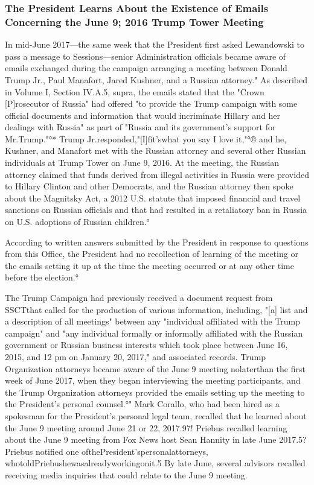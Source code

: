 \subsubsection{The President Learns About the Existence of Emails Concerning the June 9; 2016 Trump Tower Meeting}

In mid-June 2017—the same week that the President first asked Lewandowski to pass a message to Sessions—senior Administration officials became aware of emails exchanged during the campaign arranging a meeting between Donald Trump Jr., Paul Manafort, Jared Kushner, and a Russian attorney."
As described in Volume I, Section IV.A.5, supra, the emails stated that the "Crown [P]rosecutor of Russia" had offered "to provide the Trump campaign with some official documents and information that would incriminate Hillary and her dealings with Russia" as part of "Russia and its government's support for Mr.Trump."°*
Trump Jr.responded,"[I]fit'swhat you say I love it,"°® and he, Kushner, and Manafort met with the Russian attorney and several other Russian individuals at Trump Tower on June 9, 2016.%
At the meeting, the Russian attorney claimed that funds derived from illegal activities in Russia were provided to Hillary Clinton and other Democrats, and the Russian attorney then spoke about the Magnitsky Act, a 2012 U.S. statute that imposed financial and travel sanctions on Russian officials and that had resulted in a retaliatory ban in Russia on U.S. adoptions of Russian children.°

According to written answers submitted by the President in response to questions from this Office, the President had no recollection of learning of the meeting or the emails setting it up at the time the meeting occurred or at any other time before the election.°

The Trump Campaign had previously received a document request from SSCTthat called for the production of various information, including, "[a] list and a description of all meetings" between any "individual affiliated with the Trump campaign" and "any individual formally or informally affiliated with the Russian government or Russian business interests which took place between June 16, 2015, and 12 pm on January 20, 2017," and associated records.%
Trump Organization attorneys became aware of the June 9 meeting nolaterthan the first week of June 2017, when they began interviewing the meeting participants, and the Trump Organization attorneys provided the emails setting up the meeting to the President's personal counsel.°"
Mark Corallo, who had been hired as a spokesman for the President's personal legal team, recalled that he learned about the June 9 meeting around June 21 or 22, 2017.97!
Priebus recalled learning about the June 9 meeting from Fox News host Sean Hannity in late June 2017.5?
Priebus notified one ofthePresident'spersonalattorneys, whotoldPriebushewasalreadyworkingonit.5
By late June, several advisors recalled receiving media inquiries that could relate to the June 9 meeting. %

